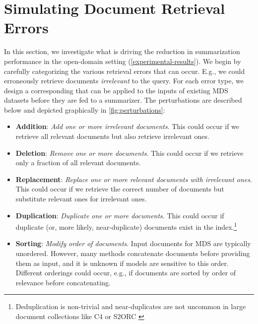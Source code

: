 \documentclass[11pt]{article}
\begin{document}
\vspace{-1.0mm}
\section{Simulating Document Retrieval Errors} 
\label{simulations}
\vspace{-1.0mm}

In this section, we investigate what is driving the reduction in summarization performance in the open-domain setting (\textsection \ref{experimental-results}). We begin by carefully categorizing the various retrieval errors that can occur. E.g., we could erroneously retrieve documents \textit{irrelevant} to the query. For each error type, we design a corresponding  that can be applied to the inputs of existing MDS datasets before they are fed to a summarizer. The perturbations are described below and depicted graphically in \autoref{fig:perturbations}:

\begin{itemize}[itemsep=0.2pt, topsep=3pt, leftmargin=10pt]
    \item \textbf{Addition}: \textit{Add one or more irrelevant documents}. This could occur if we retrieve all relevant documents but also retrieve irrelevant ones.
    \item \textbf{Deletion}: \textit{Remove one or more documents}. This could occur if we retrieve only a fraction of all relevant documents.
    \item \textbf{Replacement}: \textit{Replace one or more relevant documents with irrelevant ones}. This could occur if we retrieve the correct number of documents but substitute relevant ones for irrelevant ones.
    \item \textbf{Duplication}: \textit{Duplicate one or more documents}. This could occur if duplicate (or, more likely, near-duplicate) documents exist in the index.\footnote{Deduplication is non-trivial \citep{lee-etal-2022-deduplicating} and near-duplicates are not uncommon in large document collections like C4 \citep{dodge-etal-2021-documenting} or S2ORC \citep{lo-etal-2020-s2orc}}
    \item \textbf{Sorting}: \textit{Modify order of documents}. Input documents for MDS are typically unordered. However, many methods concatenate documents before providing them as input, and it is unknown if models are sensitive to this order. Different orderings could occur, e.g., if documents are sorted by order of relevance before concatenating.
\end{itemize}
\vspace{-1.0mm}
\end{document}
